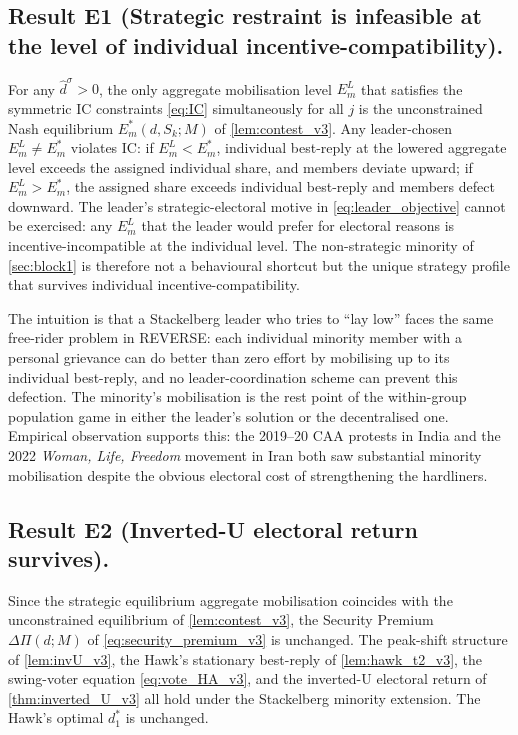 \documentclass[11pt,twoside]{extarticle}
\begin{document}
\subsection*{Result E1 (Strategic restraint is infeasible at the level of individual incentive-compatibility).} For any $\hat d^\sigma>0$, the only aggregate mobilisation level $E_m^L$ that satisfies the symmetric IC constraints \autoref{eq:IC} simultaneously for all $j$ is the unconstrained Nash equilibrium $E_m^*(d,S_k;M)$ of \autoref{lem:contest_v3}. Any leader-chosen $E_m^L\ne E_m^*$ violates IC: if $E_m^L<E_m^*$, individual best-reply at the lowered aggregate level exceeds the assigned individual share, and members deviate upward; if $E_m^L>E_m^*$, the assigned share exceeds individual best-reply and members defect downward. The leader's strategic-electoral motive in \autoref{eq:leader_objective} cannot be exercised: any $E_m^L$ that the leader would prefer for electoral reasons is incentive-incompatible at the individual level. The non-strategic minority of \autoref{sec:block1} is therefore not a behavioural shortcut but the unique strategy profile that survives individual incentive-compatibility.

The intuition is that a Stackelberg leader who tries to ``lay low'' faces the same free-rider problem in REVERSE: each individual minority member with a personal grievance can do better than zero effort by mobilising up to its individual best-reply, and no leader-coordination scheme can prevent this defection. The minority's mobilisation is the rest point of the within-group population game in either the leader's solution or the decentralised one. Empirical observation supports this: the 2019--20 CAA protests in India and the 2022 \emph{Woman, Life, Freedom} movement in Iran both saw substantial minority mobilisation despite the obvious electoral cost of strengthening the hardliners.

\subsection*{Result E2 (Inverted-U electoral return survives).} Since the strategic equilibrium aggregate mobilisation coincides with the unconstrained equilibrium of \autoref{lem:contest_v3}, the Security Premium $\Delta\Pi(d;M)$ of \autoref{eq:security_premium_v3} is unchanged. The peak-shift structure of \autoref{lem:invU_v3}, the Hawk's stationary best-reply of \autoref{lem:hawk_t2_v3}, the swing-voter equation \autoref{eq:vote_HA_v3}, and the inverted-U electoral return of \autoref{thm:inverted_U_v3} all hold under the Stackelberg minority extension. The Hawk's optimal $d_1^*$ is unchanged.
\end{document}
